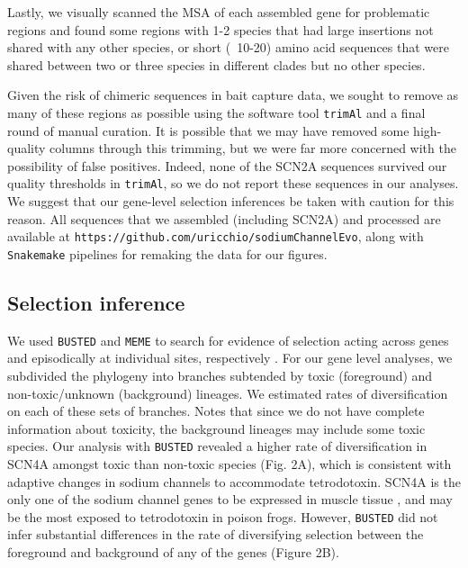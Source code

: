 \documentclass{article}
\begin{document}
Lastly, we visually scanned the MSA of each assembled gene for problematic regions and found some regions with 1-2 species that had large insertions not shared with any other species, or short (~10-20) amino acid sequences that were shared between two or three species in different clades but no other species. 

Given the risk of chimeric sequences in  bait capture data, we sought to remove as many of these regions as possible using the software tool \texttt{trimAl} and a final round of manual curation. It is possible that we may have removed some high-quality columns through this trimming, but we were far more concerned with the possibility of false positives. Indeed, none of the SCN2A sequences survived our quality thresholds in \texttt{trimAl}, so we do not report these sequences in our analyses. We suggest that our gene-level selection inferences be taken with caution for this reason. All sequences that we assembled (including SCN2A) and processed are available at \texttt{https://github.com/uricchio/sodiumChannelEvo}, along with \texttt{Snakemake} \citep{koster2012snakemake} pipelines for remaking the data for our figures.

\subsection*{Selection inference}

We used \texttt{BUSTED} and \texttt{MEME} to search for evidence of selection acting across genes and episodically at individual sites, respectively \citep{murrell2015gene,murrell2012detecting}. For our gene level analyses, we subdivided the phylogeny into branches subtended by toxic (foreground) and non-toxic/unknown (background) lineages. We estimated rates of diversification on each of these sets of branches. Notes that since we do not have complete information about toxicity, the background lineages may include some toxic species. Our analysis with \texttt{BUSTED} revealed a higher rate of diversification in SCN4A amongst toxic than non-toxic species (Fig. 2A), which is consistent with adaptive changes in sodium channels to accommodate tetrodotoxin. SCN4A is the only one of the sodium channel genes to be expressed in muscle tissue \cite{gendreau2021gene}, and may be the most exposed to tetrodotoxin in poison frogs. However, \texttt{BUSTED} did not infer substantial differences in the rate of diversifying selection between the foreground and background of any of the genes (Figure 2B).
\end{document}
